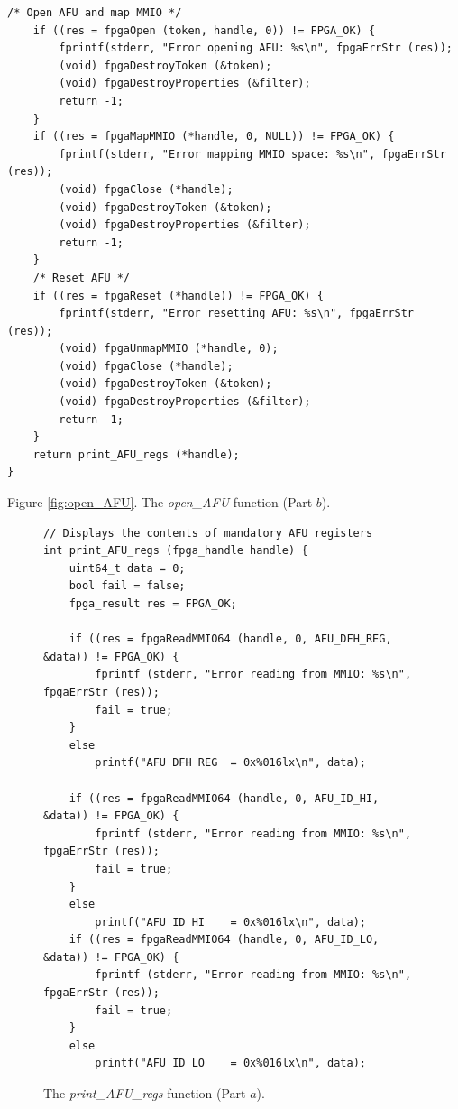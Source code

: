 \documentclass[epsfig,10pt,fullpage]{article}
\begin{document}
\lstset{language=C,numbers=none,escapechar=|}
\begin{minipage}[t]{\textwidth}
\begin{lstlisting}[name=AFU]
    /* Open AFU and map MMIO */
    if ((res = fpgaOpen (token, handle, 0)) != FPGA_OK) {
        fprintf(stderr, "Error opening AFU: %s\n", fpgaErrStr (res));
        (void) fpgaDestroyToken (&token);
        (void) fpgaDestroyProperties (&filter);
        return -1;
    }
    if ((res = fpgaMapMMIO (*handle, 0, NULL)) != FPGA_OK) {
        fprintf(stderr, "Error mapping MMIO space: %s\n", fpgaErrStr (res));
        (void) fpgaClose (*handle);
        (void) fpgaDestroyToken (&token);
        (void) fpgaDestroyProperties (&filter);
        return -1;
    }
    /* Reset AFU */
    if ((res = fpgaReset (*handle)) != FPGA_OK) {
        fprintf(stderr, "Error resetting AFU: %s\n", fpgaErrStr (res));
        (void) fpgaUnmapMMIO (*handle, 0);
        (void) fpgaClose (*handle);
        (void) fpgaDestroyToken (&token);
        (void) fpgaDestroyProperties (&filter);
        return -1;
    }
    return print_AFU_regs (*handle);
}
\end{lstlisting}
\begin{center}
Figure \ref{fig:open_AFU}. The {\it open\_AFU} function (Part $b$).
\end{center}
\end{minipage}
\lstset{language=C,numbers=none,escapechar=|}
\begin{figure}[H]
\begin{center}
\begin{minipage}[h]{\textwidth}
\begin{lstlisting}[name=manage]
// Displays the contents of mandatory AFU registers
int print_AFU_regs (fpga_handle handle) {
    uint64_t data = 0;
    bool fail = false;
    fpga_result res = FPGA_OK;

    if ((res = fpgaReadMMIO64 (handle, 0, AFU_DFH_REG, &data)) != FPGA_OK) {
        fprintf (stderr, "Error reading from MMIO: %s\n", fpgaErrStr (res));
        fail = true;
    }
    else
        printf("AFU DFH REG  = 0x%016lx\n", data);

    if ((res = fpgaReadMMIO64 (handle, 0, AFU_ID_HI, &data)) != FPGA_OK) {
        fprintf (stderr, "Error reading from MMIO: %s\n", fpgaErrStr (res));
        fail = true;
    }
    else
        printf("AFU ID HI    = 0x%016lx\n", data);
    if ((res = fpgaReadMMIO64 (handle, 0, AFU_ID_LO, &data)) != FPGA_OK) {
        fprintf (stderr, "Error reading from MMIO: %s\n", fpgaErrStr (res));
        fail = true;
    }
    else
        printf("AFU ID LO    = 0x%016lx\n", data);
\end{lstlisting}
\end{minipage}
\caption{The {\it print\_AFU\_regs} function (Part $a$).}
\label{fig:print}
\end{center}
\end{figure}
\end{document}
